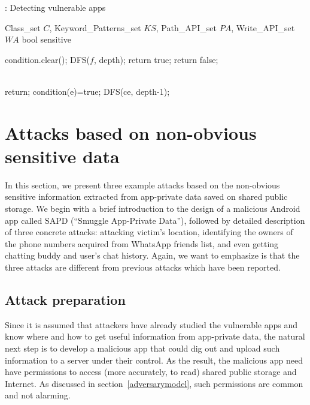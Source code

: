 \documentclass{sig-alternate}
\begin{document}
\renewcommand{\algorithmicrequire}{\textbf{Input:}}
\renewcommand{\algorithmicensure}{\textbf{Output:}}

\begin{algorithm}[htb]
\label{alg:algorithm1}
\caption{: Detecting vulnerable apps}
\begin{algorithmic}[1]
\Require Class\_set $C$, Keyword\_Patterns\_set $KS$, Path\_API\_set $PA$, Write\_API\_set $WA$
\Ensure bool sensitive

\State condition.clear();
\State DFS($f$, depth);
\State return true;
\EndIf
\EndFor
\EndFor
\State return false;

\\

\State return;
\EndIf
{}
\State condition(e)=true;
\EndFor
{}
\State DFS(ce, depth-1);
\EndFor
\EndProcedure

\end{algorithmic}
\end{algorithm}



\section{Attacks based on non-obvious \\sensitive data}
\label{sec:attack}




In this section, we present three example attacks based on the non-obvious sensitive information extracted from app-private data saved on shared public storage. We begin with a brief introduction to the design of a malicious Android app called SAPD (``Smuggle App-Private Data''), followed by detailed description of three concrete attacks: attacking victim's location, identifying the owners of the phone numbers acquired from WhatsApp friends list, and even getting chatting buddy and user's chat history. Again, we want to emphasize is that the three attacks are different from previous attacks which have been reported.


\subsection{Attack preparation}

Since it is assumed that attackers have already studied the vulnerable apps and know where and how to get useful information from app-private data, the natural next step is to develop a malicious app that could dig out and upload such information to a server under their control. As the result, the malicious app need have permissions to access (more accurately, to read) shared public storage and Internet. As discussed in section~\ref{adversarymodel}, such permissions are common and not alarming.
\end{document}
